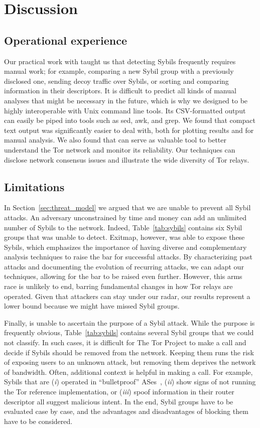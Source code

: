 \section{Discussion}
\label{sec:discussion}

\subsection{Operational experience}
\label{sec:operational}
Our practical work with \sys taught us that detecting Sybils frequently requires
manual work; for example, comparing a new Sybil group with a previously
disclosed one, sending decoy traffic over Sybils, or sorting and comparing
information in their descriptors.  It is difficult to predict all kinds of
manual analyses that might be necessary in the future, which is why we designed
\sys to be highly interoperable with Unix command line tools.  Its CSV-formatted
output can easily be piped into tools such as sed, awk, and grep.  We found that
compact text output was significantly easier to deal with, both for plotting
results and for manual analysis.  We also found that \sys can serve as valuable
tool to better understand the Tor network and monitor its reliability.  Our
techniques can disclose network consensus issues and illustrate the wide
diversity of Tor relays.

\subsection{Limitations}
\label{sec:limitations}
In Section~\ref{sec:threat_model} we argued that we are unable to prevent all
Sybil attacks.  An adversary unconstrained by time and money can add an
unlimited number of Sybils to the network.  Indeed, Table~\ref{tab:sybils}
contains six Sybil groups that \sys was unable to detect.  Exitmap, however, was
able to expose these Sybils, which emphasizes the importance of having diverse
and complementary analysis techniques to raise the bar for successful attacks.
By characterizing past attacks and documenting the evolution of recurring
attacks, we can adapt our techniques, allowing for the bar to be raised even
further.  However, this arms race is unlikely to end, barring fundamental
changes in how Tor relays are operated.  Given that attackers can stay under our
radar, our results represent a lower bound because we might have missed Sybil
groups.

Finally, \sys is unable to ascertain the purpose of a Sybil attack.  While the
purpose is frequently obvious, Table~\ref{tab:sybils} contains several Sybil
groups that we could not classify.  In such cases, it is difficult for The Tor
Project to make a call and decide if Sybils should be removed from the network.
Keeping them runs the risk of exposing users to an unknown attack, but removing
them deprives the network of bandwidth.  Often, additional context is helpful in
making a call.  For example, Sybils that are (\emph{i}) operated in
``bulletproof'' ASes~\cite{Konte2015a}, (\emph{ii}) show signs of not running
the Tor reference implementation, or (\emph{iii}) spoof information in their
router descriptor all suggest malicious intent.  In the end, Sybil groups have
to be evaluated case by case, and the advantages and disadvantages of blocking
them have to be considered.
